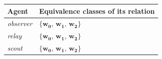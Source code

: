 \begin{tabular}{@{}ll@{}}
\toprule
\textbf{Agent} & \textbf{Equivalence classes of its relation} \\
\midrule
\textit{observer} & $\{\mathbf{w_{0}},\,\mathbf{w_{1}},\,\mathbf{w_{2}}\}$ \\
\textit{relay} & $\{\mathbf{w_{0}},\,\mathbf{w_{1}},\,\mathbf{w_{2}}\}$ \\
\textit{scout} & $\{\mathbf{w_{0}},\,\mathbf{w_{1}},\,\mathbf{w_{2}}\}$ \\
\bottomrule
\end{tabular}
